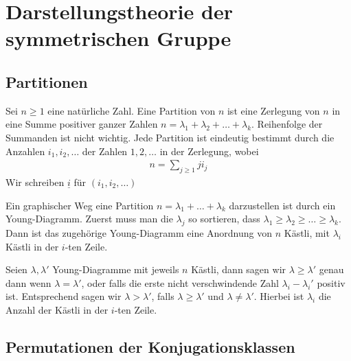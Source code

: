 \section{Darstellungstheorie der symmetrischen Gruppe}

\subsection{Partitionen}

\begin{definition}[Partition]
    Sei $n \geq 1$ eine natürliche Zahl. Eine Partition von $n$ ist eine
    Zerlegung von $n$ in eine Summe positiver ganzer Zahlen
    $n = \lambda_1 + \lambda_2 + \dots + \lambda_k$. Reihenfolge der Summanden
    ist nicht wichtig. Jede Partition ist eindeutig bestimmt durch die Anzahlen
    $i_1,i_2,\dots$ der Zahlen $1,2,\dots$ in der Zerlegung, wobei
    \begin{align*}
        n = \sum_{j \geq 1} j i_j
    \end{align*}
    Wir schreiben $\underline{i}$ für $(i_1,i_2,\dots)$
\end{definition}

\begin{definition}
    Ein graphischer Weg eine Partition $n = \lambda_1 + \dots + \lambda_k$
    darzustellen ist durch ein Young-Diagramm. Zuerst muss man die $\lambda_j$
    so sortieren, dass $\lambda_1 \geq \lambda_2 \geq \dots \geq \lambda_k$.
    Dann ist das zugehörige Young-Diagramm eine Anordnung von $n$ Kästli,
    mit $\lambda_i$ Kästli in der $i$-ten Zeile.
\end{definition}

\begin{definition}
    Seien $\lambda,\lambda'$ Young-Diagramme mit jeweils $n$ Kästli, dann
    sagen wir $\lambda \geq \lambda'$ genau dann wenn $\lambda = \lambda'$,
    oder falls die erste nicht verschwindende Zahl $\lambda_i - \lambda_i'$
    positiv ist. Entsprechend sagen wir $\lambda > \lambda'$, falls
    $\lambda \geq \lambda'$ und $\lambda \neq \lambda'$. Hierbei ist $\lambda_i$
    die Anzahl der Kästli in der $i$-ten Zeile.
\end{definition}

\subsection{Permutationen der Konjugationsklassen}


